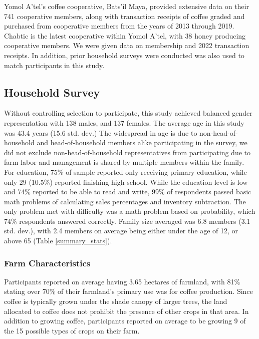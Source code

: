 \documentclass[../main.tex]{subfiles}
\begin{document}
Yomol A’tel’s coffee cooperative, Bats’il Maya, provided extensive data on their 741 cooperative members, along with transaction receipts of coffee graded and purchased from cooperative members from the years of 2013 through 2019. Chabtic is the latest cooperative within Yomol A’tel, with 38 honey producing cooperative members. We were given data on membership and 2022 transaction receipts. In addition, prior household surveys were conducted \parencite{pitts_value_2019} was also used to match participants in this study.

\subsection{Household Survey}

Without controlling selection to participate, this study achieved balanced gender representation with 138 males, and 137 females. The average age in this study was 43.4 years (15.6 std. dev.) The widespread in age is due to non-head-of-household and head-of-household members alike participating in the survey,  we did not exclude non-head-of-household representatives from participating due to farm labor and management is shared by multiple members within the family. For education, 75\% of sample reported only receiving primary education, while only 29 (10.5\%) reported finishing high school. While the education level is low and 74\% reported to be able to read and write, 99\% of respondents passed basic math problems of calculating sales percentages and inventory subtraction. The only problem met with difficulty was a math problem based on probability, which 74\% respondents answered correctly. Family size averaged was 6.8 members (3.1 std. dev.), with 2.4 members on average being either under the age of 12, or above 65 (Table \ref{summary_stats}).

\subsubsection{Farm Characteristics}

Participants reported on average having 3.65 hectares of farmland, with 81\% stating over 70\% of their farmland’s primary use was for coffee production. Since coffee is typically grown under the shade canopy of larger trees, the land allocated to coffee does not prohibit the presence of other crops in that area. In addition to growing coffee, participants reported on average to be growing 9 of the 15 possible types of crops on their farm. 
\end{document}
